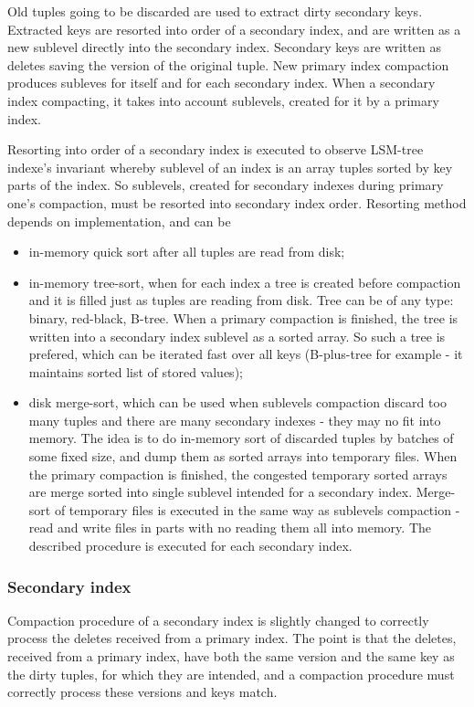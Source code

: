 \documentclass{vldb}
\begin{document}
Old tuples going to be discarded are used to extract dirty secondary keys.
Extracted keys are resorted into order of a secondary index, and are written as
a new sublevel directly into the secondary index. Secondary keys are written as
deletes saving the version of the original tuple. New primary index compaction
produces subleves for itself and for each secondary index. When a secondary
index compacting, it takes into account sublevels, created for it by a primary
index.

Resorting into order of a secondary index is executed to observe LSM-tree
indexe's invariant whereby sublevel of an index is an array tuples sorted by key
parts of the index. So sublevels, created for secondary indexes during primary
one's compaction, must be resorted into secondary index order. Resorting method
depends on implementation, and can be
\begin{itemize}
\item in-memory quick sort after all tuples are read from disk;
\item in-memory tree-sort, when for each index a tree is created before
compaction and it is filled just as tuples are reading from disk. Tree can be of
any type: binary, red-black, B-tree. When a primary compaction is finished, the
tree is written into a secondary index sublevel as a sorted array. So such a
tree is prefered, which can be iterated fast over all keys (B-plus-tree for
example - it maintains sorted list of stored values);
\item disk merge-sort, which can be used when sublevels compaction discard too
many tuples and there are many secondary indexes - they may no fit into memory.
The idea is to do in-memory sort of discarded tuples by batches of some fixed
size, and dump them as sorted arrays into temporary files. When the primary
compaction is finished, the congested temporary sorted arrays are merge sorted
into single sublevel intended for a secondary index. Merge-sort of temporary
files is executed in the same way as sublevels compaction - read and write files
in parts with no reading them all into memory. The described procedure is
executed for each secondary index.
\end{itemize}

\subsubsection{Secondary index}

Compaction procedure of a secondary index is slightly changed to correctly
process the deletes received from a primary index. The point is that the
deletes, received from a primary index, have both the same version and the same
key as the dirty tuples, for which they are intended, and a compaction procedure
must correctly process these versions and keys match.
\end{document}
